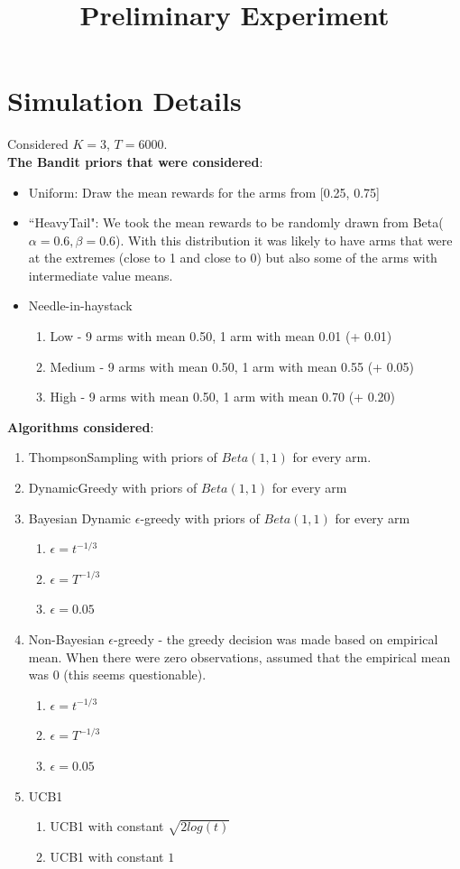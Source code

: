 \documentclass[11pt,letterpaper]{article}
\begin{document}
 

\title{Preliminary Experiment}
\maketitle

\section*{Simulation Details}

Considered $K = 3$, $T = 6000$. \\
\textbf{The Bandit priors that were considered}:
\begin{itemize}
\item Uniform: Draw the mean rewards for the arms from [0.25, 0.75]
\item ``HeavyTail": We took the mean rewards to be randomly drawn from Beta($\alpha=0.6,\beta=0.6$). With this distribution it was likely to have arms that were at the extremes (close to 1 and close to 0) but also some of the arms with intermediate value means.
\item Needle-in-haystack
\begin{enumerate}
\item Low - 9 arms with mean 0.50, 1 arm with mean 0.01 (+ 0.01)
\item Medium - 9 arms with mean 0.50, 1 arm with mean 0.55 (+ 0.05)
\item High - 9 arms with mean 0.50, 1 arm with mean 0.70 (+ 0.20)
\end{enumerate}
\end{itemize}
\textbf{Algorithms considered}:
\begin{enumerate}
\item ThompsonSampling with priors of $Beta(1, 1)$ for every arm.
\item DynamicGreedy with priors of $Beta(1, 1)$ for every arm
\item Bayesian Dynamic $\epsilon$-greedy with priors of $Beta(1, 1)$ for every arm
\begin{enumerate}
\item $\epsilon=t^{-1/3}$
\item $\epsilon=T^{-1/3}$
\item $\epsilon=0.05$
\end{enumerate}
\item Non-Bayesian $\epsilon$-greedy - the greedy decision was made based on empirical mean. When there were zero observations, assumed that the empirical mean was 0 (this seems questionable).
\begin{enumerate}
\item $\epsilon=t^{-1/3}$
\item $\epsilon=T^{-1/3}$
\item $\epsilon=0.05$
\end{enumerate}
\item UCB1
\begin{enumerate}
\item UCB1 with constant $\sqrt{2log(t)}$
\item UCB1 with constant $1$
\end{enumerate}
\end{enumerate}
\end{document}
